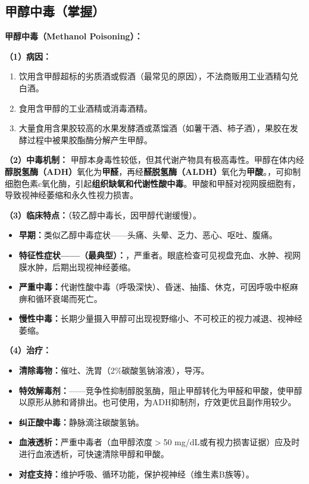 \subsection{甲醇中毒（掌握）}

\begin{keybox}
\textbf{甲醇中毒（Methanol Poisoning）：}

\textbf{（1）病因：}
\begin{enumerate}[leftmargin=*]
    \item 饮用含甲醇超标的劣质酒或假酒（最常见的原因），不法商贩用工业酒精勾兑白酒。
    \item 食用含甲醇的工业酒精或消毒酒精。
    \item 大量食用含果胶较高的水果发酵酒或蒸馏酒（如薯干酒、柿子酒），果胶在发酵过程中被果胶酯酶分解产生甲醇。
\end{enumerate}

\textbf{（2）中毒机制：}\difficulty
甲醇本身毒性较低，但其代谢产物具有极高毒性。甲醇在体内经\textbf{醇脱氢酶（ADH）}氧化为\textbf{甲醛}，再经\textbf{醛脱氢酶（ALDH）}氧化为\textbf{甲酸}。，可抑制细胞色素c氧化酶，引起\textbf{组织缺氧和代谢性酸中毒}。甲酸和甲醛对视网膜细胞有，导致视神经萎缩和永久性视力损害。

\textbf{（3）临床特点：}（较乙醇中毒长，因甲醇代谢缓慢）。
\begin{itemize}[leftmargin=*]
    \item \textbf{早期：}类似乙醇中毒症状——头痛、头晕、乏力、恶心、呕吐、腹痛。
    \item \textbf{特征性症状——（最典型）：}，严重者。眼底检查可见视盘充血、水肿、视网膜水肿，后期出现视神经萎缩。
    \item \textbf{严重中毒：}代谢性酸中毒（呼吸深快）、昏迷、抽搐、休克，可因呼吸中枢麻痹和循环衰竭而死亡。
    \item \textbf{慢性中毒：}长期少量摄入甲醇可出现视野缩小、不可校正的视力减退、视神经萎缩。
\end{itemize}

\textbf{（4）治疗：}
\begin{itemize}[leftmargin=*]
    \item \textbf{清除毒物：}催吐、洗胃（2\%碳酸氢钠溶液），导泻。
    \item \textbf{特效解毒剂：}——竞争性抑制醇脱氢酶，阻止甲醇转化为甲醛和甲酸，使甲醇以原形从肺和肾排出。也可使用，为ADH抑制剂，疗效更优且副作用较少。
    \item \textbf{纠正酸中毒：}静脉滴注碳酸氢钠。
    \item \textbf{血液透析：}严重中毒者（血甲醇浓度$>$50 mg/dL或有视力损害证据）应及时进行血液透析，可快速清除甲醇和甲酸。
    \item \textbf{对症支持：}维护呼吸、循环功能，保护视神经（维生素B族等）。
\end{itemize}


\end{keybox}
